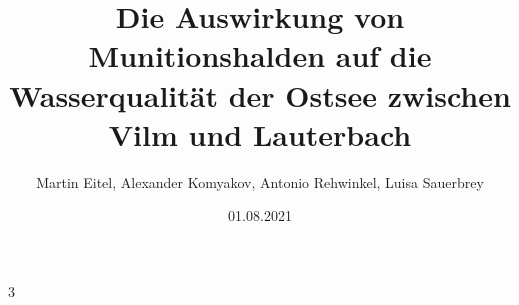 \documentclass[12pt,titlepage]{article}
\begin{document}
\begin{titlepage}
\title{Die Auswirkung von Munitionshalden auf die Wasserqualität der Ostsee zwischen Vilm und Lauterbach}
\date{01.08.2021}
3
\author{Martin Eitel, Alexander Komyakov, Antonio Rehwinkel, Luisa Sauerbrey}
\maketitle
\end{titlepage}
\end{document}
